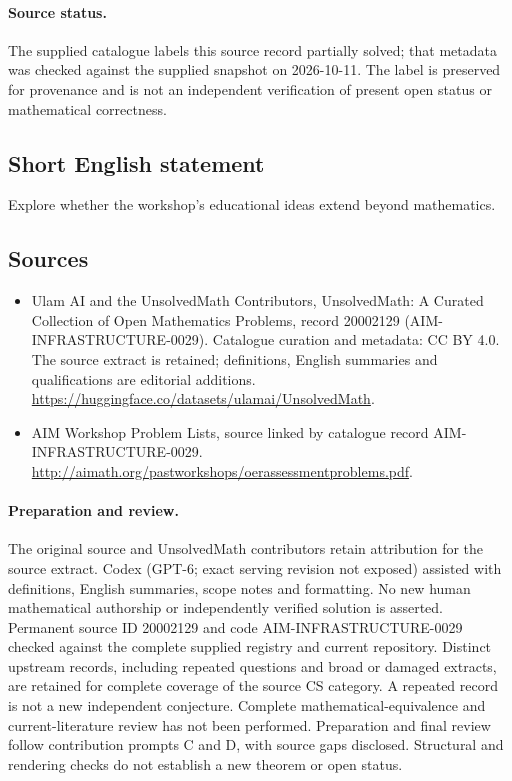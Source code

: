 \documentclass[11pt]{article}
\begin{document}
\paragraph{Source status.}
The supplied catalogue labels this source record partially solved; that metadata was checked against the supplied snapshot on 2026-10-11. The label is preserved for provenance and is not an independent verification of present open status or mathematical correctness.
\subsection{Short English statement}
Explore whether the workshop's educational ideas extend beyond mathematics.
\subsection{Sources}
\begin{itemize}
\item[\hypertarget{source:20002129:1}{S1}] Ulam AI and the UnsolvedMath Contributors, UnsolvedMath: A Curated Collection of Open Mathematics Problems, record 20002129 (AIM-INFRASTRUCTURE-0029). Catalogue curation and metadata: CC BY 4.0. The source extract is retained; definitions, English summaries and qualifications are editorial additions.
\url{https://huggingface.co/datasets/ulamai/UnsolvedMath}.
\item[\hypertarget{source:20002129:2}{S2}] AIM Workshop Problem Lists, source linked by catalogue record AIM-INFRASTRUCTURE-0029.
\url{http://aimath.org/pastworkshops/oerassessmentproblems.pdf}.
\end{itemize}
\paragraph{Preparation and review.}
The original source and UnsolvedMath contributors retain attribution for the source extract. Codex (GPT-6; exact serving revision not exposed) assisted with definitions, English summaries, scope notes and formatting. No new human mathematical authorship or independently verified solution is asserted. Permanent source ID 20002129 and code AIM-INFRASTRUCTURE-0029 checked against the complete supplied registry and current repository. Distinct upstream records, including repeated questions and broad or damaged extracts, are retained for complete coverage of the source CS category. A repeated record is not a new independent conjecture. Complete mathematical-equivalence and current-literature review has not been performed. Preparation and final review follow contribution prompts C and D, with source gaps disclosed. Structural and rendering checks do not establish a new theorem or open status.
\label{end:20002129}
\end{document}
